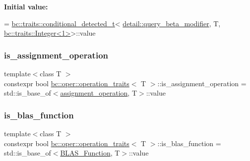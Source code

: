 {\bfseries Initial value\+:}
\begin{DoxyCode}
= \hyperlink{namespacebc_1_1traits_a1a6d378947ec32acd457890854bcd592}{bc::traits::conditional\_detected\_t}<
            \hyperlink{namespacebc_1_1oper_1_1detail_abb9645396fc587030351c50ca6b427e2}{detail::query\_beta\_modifier}, T, 
      \hyperlink{structbc_1_1traits_1_1Integer}{bc::traits::Integer<1>}>::value
\end{DoxyCode}
\mbox{\label{structbc_1_1oper_1_1operation__traits_a25bdb0c5116cbafc2adfffda6ad5e0e8}} 
\subsubsection{\texorpdfstring{is\+\_\+assignment\+\_\+operation}{is\_assignment\_operation}}
{\footnotesize\ttfamily template$<$class T $>$ \\
constexpr bool \hyperlink{structbc_1_1oper_1_1operation__traits}{bc\+::oper\+::operation\+\_\+traits}$<$ T $>$\+::is\+\_\+assignment\+\_\+operation = std\+::is\+\_\+base\+\_\+of$<$\hyperlink{structbc_1_1oper_1_1assignment__operation}{assignment\+\_\+operation}, T$>$\+::value\hspace{0.3cm}{\ttfamily [static]}}

\mbox{\label{structbc_1_1oper_1_1operation__traits_a330c3f46193bcb67fb5c65464ea9c0fa}} 
\subsubsection{\texorpdfstring{is\+\_\+blas\+\_\+function}{is\_blas\_function}}
{\footnotesize\ttfamily template$<$class T $>$ \\
constexpr bool \hyperlink{structbc_1_1oper_1_1operation__traits}{bc\+::oper\+::operation\+\_\+traits}$<$ T $>$\+::is\+\_\+blas\+\_\+function = std\+::is\+\_\+base\+\_\+of$<$\hyperlink{structbc_1_1oper_1_1BLAS__Function}{B\+L\+A\+S\+\_\+\+Function}, T$>$\+::value\hspace{0.3cm}{\ttfamily [static]}}

